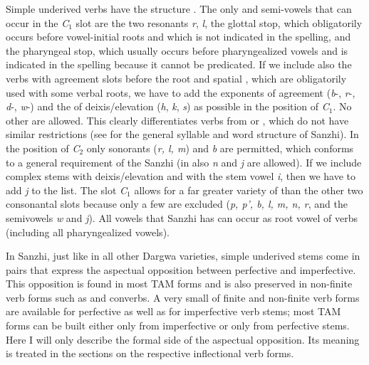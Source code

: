 Simple underived verbs have the structure . The only  and semi-vowels that can occur in the \textit{C$_{1}$} slot are the two resonants \textit{r}, \textit{l}, the glottal stop, which obligatorily occurs before vowel-initial roots and which is not indicated in the spelling, and the pharyngeal stop, which usually occurs before pharyngealized vowels and is indicated in the spelling because it cannot be predicated. If we include also the verbs with  agreement slots before the root and spatial , which are obligatorily used with some verbal roots, we have to add the exponents of  agreement (\textit{b}-, \textit{r}-, \textit{d}-, \textit{w}-) and the  of deixis/elevation  (\textit{h}, \textit{k}, \textit{s}) as possible in the position of \textit{C$_{1}$}. No other  are allowed. This clearly differentiates verbs from  or , which do not have similar restrictions (see  for the general syllable and word structure of Sanzhi). In the position of \textit{C$_{2}$} only sonorants (\textit{r, l, m}) and \textit{b} are permitted, which conforms to a general requirement of the Sanzhi  (in  also \textit{n} and \textit{j} are allowed). If we include complex stems with deixis/elevation  and with the stem vowel \textit{i}, then we have to add \textit{j} to the list. The slot \textit{C$_{1}$} allows for a far greater variety of  than the other two consonantal slots because only a few  are excluded (\textit{p, p', b, l, m, n, r}, and the semivowels \textit{w} and \textit{j}). All vowels that Sanzhi has can occur as root vowel of verbs (including all pharyngealized vowels).

In Sanzhi, just like in all other Dargwa varieties, simple underived stems come in pairs that express the aspectual opposition between perfective and imperfective. This opposition is found in most TAM forms and is also preserved in non-finite verb forms such as  and converbs. A very small  of finite and non-finite verb forms are available for perfective as well as for imperfective verb stems; most TAM forms can be built either only from imperfective or only from perfective stems. Here I will only describe the formal side of the aspectual opposition. Its meaning is treated in the sections on the respective inflectional verb forms.

